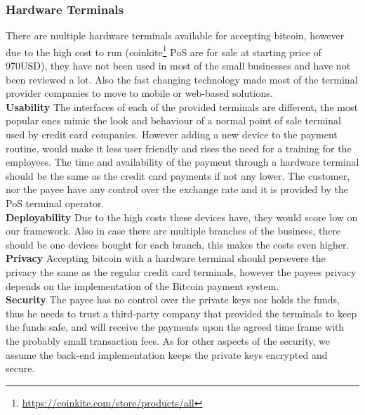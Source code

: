 \subsubsection{Hardware Terminals}
There are multiple hardware terminals available for accepting bitcoin, however due to the high cost to run (\eg coinkite\footnote{\url{https://coinkite.com/store/products/all}} PoS are for sale at starting price of 970USD), they have not been used in most of the small businesses and have not been reviewed a lot. Also the fast changing technology made most of the terminal provider companies to move to mobile or web-based solutions.
\\\textbf{Usability}
The interfaces of each of the provided terminals are different, the most popular ones mimic the look and behaviour of a normal point of sale terminal used by credit card companies. However adding a new device to the payment routine, would make it less user friendly and rises the need for a training for the employees. The time and availability of the payment through a hardware terminal should be the same as the credit card payments if not any lower. The customer, nor the payee have any control over the exchange rate and it is provided by the PoS terminal operator.
\\\textbf{Deployability}
Due to the high costs these devices have, they would score low on our framework. Also in case there are multiple branches of the business, there should be one devices bought for each branch, this makes the costs even higher.
\\\textbf{Privacy}
Accepting bitcoin with a hardware terminal should persevere the privacy the same as the regular credit card terminals, however the payees privacy depends on the implementation of the Bitcoin payment system. 
\\\textbf{Security}
The payee has no control over the private keys nor holds the funds, thus he needs to trust a third-party company that provided the terminals to keep the funds safe, and will receive the payments upon the agreed time frame with the probably small transaction fees. As for other aspects of the security, we assume the back-end implementation keeps the private keys encrypted and secure. 


